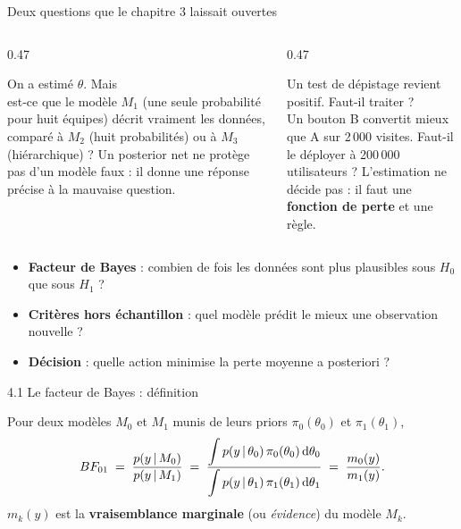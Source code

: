 \begin{frame}{Deux questions que le chapitre 3 laissait ouvertes}
\begin{columns}[t]
\begin{column}{0.47\textwidth}
\begin{ebox}
On a estimé $\theta$. Mais \\
est-ce que le modèle $M_1$ (une seule probabilité
pour huit équipes) décrit vraiment les données, comparé à $M_2$
(huit probabilités) ou à $M_3$ (hiérarchique) ?
\vspace{1mm}
\footnotesize Un posterior net ne protège pas d'un modèle faux :
il donne une réponse précise à la mauvaise question.
\end{ebox}
\end{column}
\begin{column}{0.47\textwidth}
\begin{ebox}
Un test de dépistage revient positif. Faut-il traiter ? \\
Un bouton B convertit mieux que A sur 2\,000 visites.
Faut-il le déployer à 200\,000 utilisateurs ?
\vspace{1mm}
\footnotesize L'estimation ne décide pas : il faut une
\textbf{fonction de perte} et une règle.
\end{ebox}
\end{column}
\end{columns}
\vspace{1mm}
\begin{kbox}
\begin{itemize}
  \item \textbf{Facteur de Bayes} : combien de fois les données sont plus plausibles sous $H_0$ que sous $H_1$ ?
  \item \textbf{Critères hors échantillon} : quel modèle prédit le mieux une observation nouvelle ?
  \item \textbf{Décision} : quelle action minimise la perte moyenne a posteriori ?
\end{itemize}
\end{kbox}
\end{frame}

\begin{frame}{4.1 Le facteur de Bayes : définition}
\small
\begin{kbox}[Définition]
Pour deux modèles $M_0$ et $M_1$ munis de leurs priors $\pi_0(\theta_0)$ et $\pi_1(\theta_1)$,
\[
BF_{01} \;=\; \frac{p(y \,\vert\, M_0)}{p(y \,\vert\, M_1)}
\;=\; \frac{\displaystyle\int p(y \,\vert\, \theta_0)\, \pi_0(\theta_0)\,\mathrm{d}\theta_0}
{\displaystyle\int p(y \,\vert\, \theta_1)\, \pi_1(\theta_1)\,\mathrm{d}\theta_1}
\;=\; \frac{m_0(y)}{m_1(y)} .
\]
$m_k(y)$ est la \textbf{vraisemblance marginale} (ou \textit{évidence}) du modèle $M_k$.
\end{kbox}
\vspace{1mm}
\end{frame}

